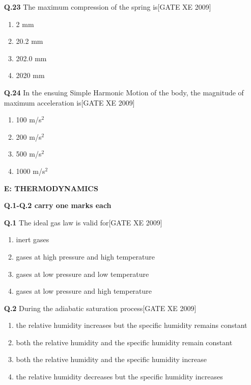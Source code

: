 \documentclass[journal,12pt,onecolumn]{IEEEtran}
\theoremstyle{remark}
\begin{document}
\begin{enumerate}
\item[\textbf{Q.23}] The maximum compression of the spring is\hfill[GATE XE 2009]
\begin{multicols}{2}
\begin{enumerate}
    \item 2 mm
    \item 20.2 mm
    \item 202.0 mm
    \item 2020 mm
\end{enumerate}
\end{multicols}

\item[\textbf{Q.24}] In the ensuing Simple Harmonic Motion of the body, the magnitude of maximum acceleration is\hfill[GATE XE 2009]
\begin{multicols}{2}
\begin{enumerate}
    \item 100 m/s$^2$
    \item 200 m/s$^2$
    \item 500 m/s$^2$
    \item 1000 m/s$^2$ 
  
    \end{enumerate}
      \end{multicols}
   \clearpage
   \textbf{E: THERMODYNAMICS}

\vspace{0.5cm}

\textbf{Q.1-Q.2 carry one marks each}
\item[\textbf{Q.1}] The ideal gas law is valid for\hfill[GATE XE 2009]
\begin{multicols}{2}
\begin{enumerate}
    \item inert gases
    \item gases at high pressure and high temperature
    \item gases at low pressure and low temperature
    \item gases at low pressure and high temperature
\end{enumerate}
\end{multicols}

\vspace{0.3cm}

\item[\textbf{Q.2}] During the adiabatic saturation process\hfill[GATE XE 2009]
\begin{multicols}{2}
\begin{enumerate}
    \item the relative humidity increases but the specific humidity remains constant
    \item both the relative humidity and the specific humidity remain constant
    \item both the relative humidity and the specific humidity increase
    \item the relative humidity decreases but the specific humidity increases
\end{enumerate}
\end{multicols}


\end{enumerate}
\end{document}
